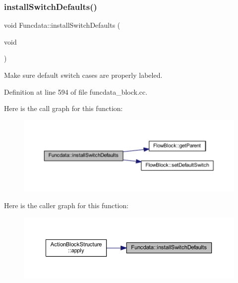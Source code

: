 \subsubsection{\texorpdfstring{installSwitchDefaults()}{installSwitchDefaults()}}
{\footnotesize\ttfamily void Funcdata\+::install\+Switch\+Defaults (\begin{DoxyParamCaption}\item[{void}]{ }\end{DoxyParamCaption})}



Make sure default switch cases are properly labeled. 



Definition at line 594 of file funcdata\+\_\+block.\+cc.

Here is the call graph for this function\+:
\nopagebreak
\begin{figure}[H]
\begin{center}
\leavevmode
\includegraphics[width=350pt]{class_funcdata_a9021f01b57f8704db66341bc7f65f39f_cgraph}
\end{center}
\end{figure}
Here is the caller graph for this function\+:
\nopagebreak
\begin{figure}[H]
\begin{center}
\leavevmode
\includegraphics[width=350pt]{class_funcdata_a9021f01b57f8704db66341bc7f65f39f_icgraph}
\end{center}
\end{figure}
\mbox{\label{class_funcdata_a34f5244a2b3edcf7276f0084f7b48281}} 
